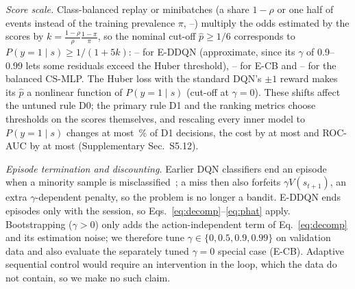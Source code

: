 \emph{Score scale.} Class-balanced replay or minibatches (a share $1-\rho$ or one half of events instead of the training prevalence $\pi$, \SSPrevMin--\SSPrevMax) multiply the odds estimated by the scores by $k=\frac{1-\rho}{\rho}\frac{1-\pi}{\pi}$, so the nominal cut-off $\hat p\ge1/6$ corresponds to $P(y=1\mid s)\ge1/(1+5k)$: \SSEDDQNCutMin--\SSEDDQNCutMax{} for E-DDQN (approximate, since its $\gamma$ of 0.9--0.99 lets some residuals exceed the Huber threshold), \SSECBCutMin--\SSECBCutMax{} for E-CB and \SSCSMLPCutMin--\SSCSMLPCutMax{} for the balanced CS-MLP. The Huber loss with the standard DQN's $\pm1$ reward makes its $\hat p$ a nonlinear function of $P(y=1\mid s)$ (cut-off \SSDQNHuberCut{} at $\gamma=0$). These shifts affect the untuned rule D0; the primary rule D1 and the ranking metrics choose thresholds on the scores themselves, and rescaling every inner model to $P(y=1\mid s)$ changes at most \SSSensMaxChanged\,\% of D1 decisions, the cost by at most \SSSensMaxCostDelta{} and ROC-AUC by at most \SSSensMaxAucDelta{} (Supplementary Sec.~S5.12).

\emph{Episode termination and discounting.} Earlier DQN classifiers end an episode when a minority sample is misclassified~\cite{lin2020imbalanced,yang2024drlimbalanced}; a miss then also forfeits $\gamma V(s_{t+1})$, an extra $\gamma$-dependent penalty, so the problem is no longer a bandit. E-DDQN ends episodes only with the session, so Eqs.~\eqref{eq:decomp}--\eqref{eq:phat} apply. Bootstrapping ($\gamma>0$) only adds the action-independent term of Eq.~\eqref{eq:decomp} and its estimation noise; we therefore tune $\gamma\in\{0,0.5,0.9,0.99\}$ on validation data and also evaluate the separately tuned $\gamma=0$ special case (E-CB). Adaptive sequential control would require an intervention in the loop, which the data do not contain, so we make no such claim.

